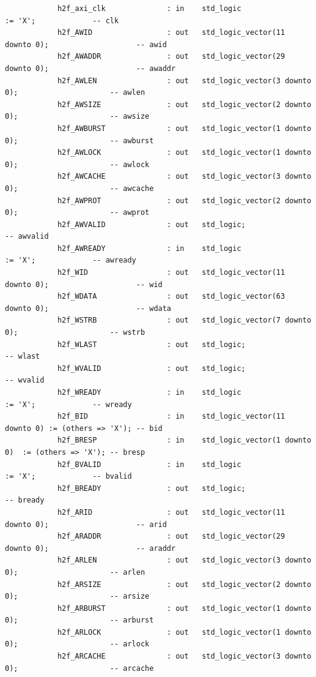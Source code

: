 \documentclass[conference]{IEEEtran}
\begin{document}
\begin{lstlisting}
			h2f_axi_clk              : in    std_logic                     := 'X';             -- clk
			h2f_AWID                 : out   std_logic_vector(11 downto 0);                    -- awid
			h2f_AWADDR               : out   std_logic_vector(29 downto 0);                    -- awaddr
			h2f_AWLEN                : out   std_logic_vector(3 downto 0);                     -- awlen
			h2f_AWSIZE               : out   std_logic_vector(2 downto 0);                     -- awsize
			h2f_AWBURST              : out   std_logic_vector(1 downto 0);                     -- awburst
			h2f_AWLOCK               : out   std_logic_vector(1 downto 0);                     -- awlock
			h2f_AWCACHE              : out   std_logic_vector(3 downto 0);                     -- awcache
			h2f_AWPROT               : out   std_logic_vector(2 downto 0);                     -- awprot
			h2f_AWVALID              : out   std_logic;                                        -- awvalid
			h2f_AWREADY              : in    std_logic                     := 'X';             -- awready
			h2f_WID                  : out   std_logic_vector(11 downto 0);                    -- wid
			h2f_WDATA                : out   std_logic_vector(63 downto 0);                    -- wdata
			h2f_WSTRB                : out   std_logic_vector(7 downto 0);                     -- wstrb
			h2f_WLAST                : out   std_logic;                                        -- wlast
			h2f_WVALID               : out   std_logic;                                        -- wvalid
			h2f_WREADY               : in    std_logic                     := 'X';             -- wready
			h2f_BID                  : in    std_logic_vector(11 downto 0) := (others => 'X'); -- bid
			h2f_BRESP                : in    std_logic_vector(1 downto 0)  := (others => 'X'); -- bresp
			h2f_BVALID               : in    std_logic                     := 'X';             -- bvalid
			h2f_BREADY               : out   std_logic;                                        -- bready
			h2f_ARID                 : out   std_logic_vector(11 downto 0);                    -- arid
			h2f_ARADDR               : out   std_logic_vector(29 downto 0);                    -- araddr
			h2f_ARLEN                : out   std_logic_vector(3 downto 0);                     -- arlen
			h2f_ARSIZE               : out   std_logic_vector(2 downto 0);                     -- arsize
			h2f_ARBURST              : out   std_logic_vector(1 downto 0);                     -- arburst
			h2f_ARLOCK               : out   std_logic_vector(1 downto 0);                     -- arlock
			h2f_ARCACHE              : out   std_logic_vector(3 downto 0);                     -- arcache

\end{lstlisting}
\end{document}
